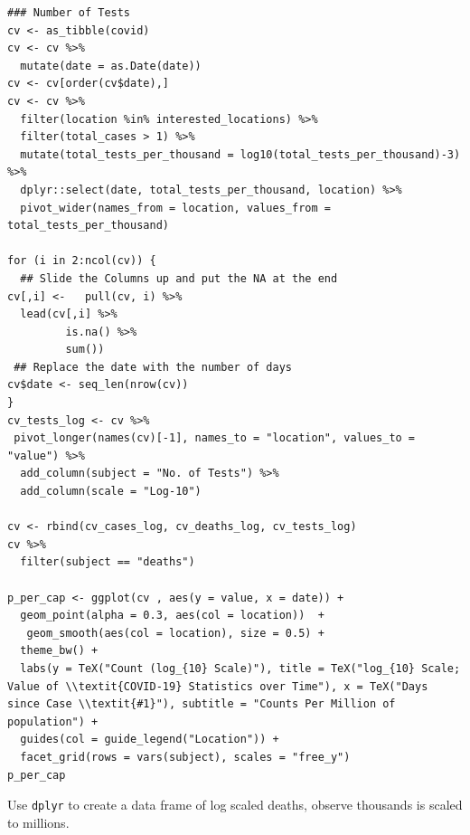 \documentclass[11pt]{article}
\begin{document}
\begin{listing}[htbp]
\begin{verbatim}
### Number of Tests
cv <- as_tibble(covid)
cv <- cv %>%
  mutate(date = as.Date(date))
cv <- cv[order(cv$date),]
cv <- cv %>%
  filter(location %in% interested_locations) %>%
  filter(total_cases > 1) %>%
  mutate(total_tests_per_thousand = log10(total_tests_per_thousand)-3) %>%
  dplyr::select(date, total_tests_per_thousand, location) %>%
  pivot_wider(names_from = location, values_from = total_tests_per_thousand)

for (i in 2:ncol(cv)) {
  ## Slide the Columns up and put the NA at the end
cv[,i] <-   pull(cv, i) %>%
  lead(cv[,i] %>%
         is.na() %>%
         sum())
 ## Replace the date with the number of days
cv$date <- seq_len(nrow(cv))
}
cv_tests_log <- cv %>%
 pivot_longer(names(cv)[-1], names_to = "location", values_to = "value") %>%
  add_column(subject = "No. of Tests") %>%
  add_column(scale = "Log-10")

cv <- rbind(cv_cases_log, cv_deaths_log, cv_tests_log)
cv %>%
  filter(subject == "deaths")

p_per_cap <- ggplot(cv , aes(y = value, x = date)) +
  geom_point(alpha = 0.3, aes(col = location))  +
   geom_smooth(aes(col = location), size = 0.5) +
  theme_bw() +
  labs(y = TeX("Count (log_{10} Scale)"), title = TeX("log_{10} Scale; Value of \\textit{COVID-19} Statistics over Time"), x = TeX("Days since Case \\textit{#1}"), subtitle = "Counts Per Million of population") +
  guides(col = guide_legend("Location")) +
  facet_grid(rows = vars(subject), scales = "free_y")
p_per_cap
\end{verbatim}
\caption{\label{orgd857eec}Use \texttt{dplyr} to create a data frame of log scaled deaths, observe thousands is scaled to millions.}
\end{listing}
\end{document}
